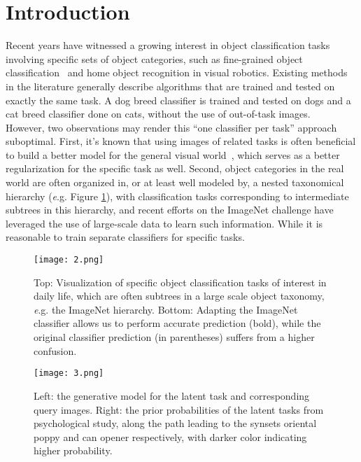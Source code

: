 \documentclass[10pt,twocolumn,letterpaper]{article}
\begin{document}
\section{Introduction}
Recent years have witnessed a growing interest in object classification tasks involving specific sets of object categories, such as fine-grained object classification~\cite{Birdlets,Novel} and home object recognition in visual robotics. Existing methods in the literature generally describe algorithms that are trained and tested on exactly the same task. A dog breed classifier is trained and tested on dogs and a cat breed classifier done on cats, without the use of out-of-task images.\\
\indent However, two observations may render this ``one classifier per task'' approach suboptimal. First, it’s known that using images of related tasks is often beneficial to build a better model for the general visual world~\cite{transfer}, which serves as a better regularization for the specific task as well. Second, object categories in the real world are often organized in, or at least well modeled by, a nested taxonomical hierarchy ({\emph e.g.} Figure \ref{fig}), with classification tasks corresponding to intermediate subtrees in this hierarchy, and recent efforts on the ImageNet challenge \cite{image,Imagenet} have leveraged the use of large-scale data to learn such information. While it is reasonable to train separate classifiers for specific tasks.
\begin{figure}[t]
\begin{center}
\texttt{[image: 2.png]}
\end{center}
\caption{Top: Visualization of specific object classification tasks of interest in daily life, which are often subtrees in a large scale object taxonomy, {\emph e.g.} the ImageNet hierarchy. Bottom: Adapting the ImageNet classifier allows us to perform accurate prediction (bold), while the original classifier prediction (in parentheses) suffers from a higher confusion.}
\label{fig}
\end{figure}
\begin{figure}[t]
\begin{center}
\texttt{[image: 3.png]}
\end{center}
\caption{Left: the generative model for the latent task and corresponding query images. Right: the prior probabilities of the latent tasks from psychological study, along the path leading to the synsets oriental poppy and can opener respectively, with darker color indicating higher probability.}
\label{fig2}
\end{figure}
\end{document}
